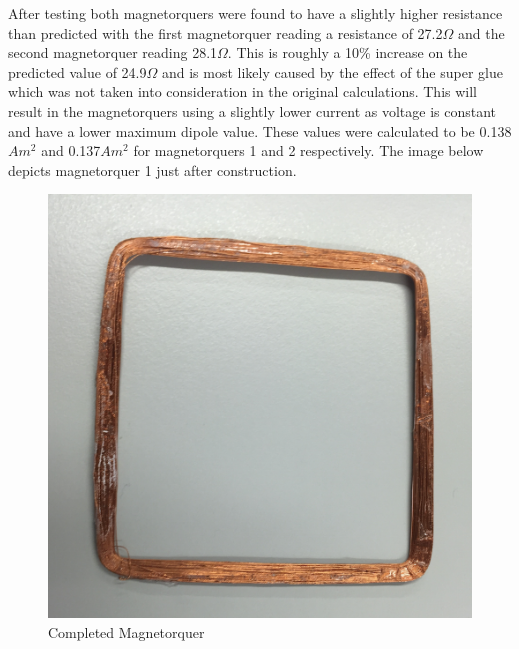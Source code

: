 After testing both magnetorquers were found to have a slightly higher resistance than predicted with the first magnetorquer reading a resistance of 27.2$\Omega$ and the second magnetorquer reading 28.1$\Omega$.  This is roughly a 10\% increase on the predicted value of 24.9$\Omega$ and is most likely caused by the effect of the super glue which was not taken into consideration in the original calculations.  This will result in the magnetorquers using a slightly lower current as voltage is constant and have a lower maximum dipole value.  These values were calculated to be 0.138$Am^2$ and 0.137$Am^2$ for magnetorquers 1 and 2 respectively.  The image below depicts magnetorquer 1 just after construction.

\vspace{-6mm}
\begin{center}
\begin{figure}[H]
\caption{Completed Magnetorquer}
\vspace{-4mm}
\centering
\includegraphics[scale = 0.4]{Magnetorquer.png}
\end{figure}
\end{center}
\vspace{-5mm}

